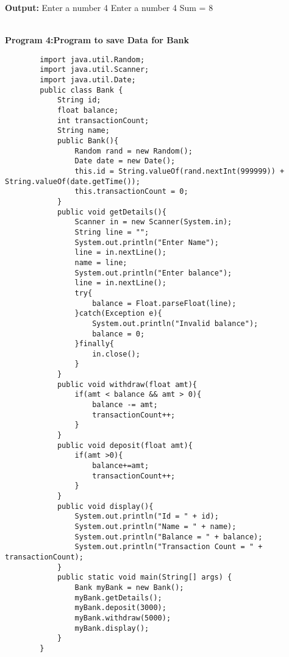 \documentclass{book}
\begin{document}
{\begin{verbatim}
\end{verbatim}
\par
\textbf{Output:}
Enter a number
4
Enter a number
4
Sum = 8
\\
\\
\par
\textbf{Program 4:Program to save Data for Bank}
\begin{verbatim}
        import java.util.Random;
        import java.util.Scanner;
        import java.util.Date;
        public class Bank {
            String id;
            float balance;
            int transactionCount;
            String name;
            public Bank(){
                Random rand = new Random();
                Date date = new Date();
                this.id = String.valueOf(rand.nextInt(999999)) + String.valueOf(date.getTime());
                this.transactionCount = 0;
            }
            public void getDetails(){
                Scanner in = new Scanner(System.in);
                String line = "";
                System.out.println("Enter Name");
                line = in.nextLine();
                name = line;
                System.out.println("Enter balance");
                line = in.nextLine();
                try{
                    balance = Float.parseFloat(line);
                }catch(Exception e){
                    System.out.println("Invalid balance");
                    balance = 0;
                }finally{
                    in.close();
                }
            }
            public void withdraw(float amt){
                if(amt < balance && amt > 0){
                    balance -= amt;
                    transactionCount++;
                }
            }
            public void deposit(float amt){
                if(amt >0){
                    balance+=amt;
                    transactionCount++;
                }
            }
            public void display(){
                System.out.println("Id = " + id);
                System.out.println("Name = " + name);
                System.out.println("Balance = " + balance);
                System.out.println("Transaction Count = " + transactionCount);
            }
            public static void main(String[] args) {
                Bank myBank = new Bank();
                myBank.getDetails();
                myBank.deposit(3000);
                myBank.withdraw(5000);
                myBank.display();
            }
        }


\end{verbatim}}
\end{document}
